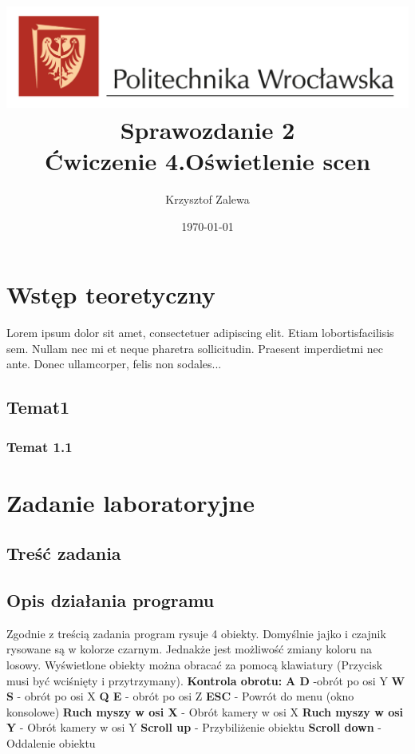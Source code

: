 \documentclass{article}
\title{
  \centering
  \includegraphics[width=\textwidth]{images/logo_PWr_kolor_poziom.png}\\
  \fontsize{28pt}{30pt}\selectfont Sprawozdanie 2\\
  \fontsize{14pt}{30pt}\selectfont Ćwiczenie 4.Oświetlenie scen}
\author{Krzysztof Zalewa}
\date{\daymonthyear\today}
\begin{document}
  \maketitle
  \pagebreak
  \tableofcontents
  
  \section{Wstęp teoretyczny}
  Lorem  ipsum  dolor  sit  amet,  consectetuer  adipiscing  
  elit.   Etiam  lobortisfacilisis sem.  Nullam nec mi et 
  neque pharetra sollicitudin.  Praesent imperdietmi nec ante. 
  Donec ullamcorper, felis non sodales...
  \subsection{Temat1}
  \subsubsection{Temat 1.1}

  \section{Zadanie laboratoryjne}
  \subsection{Treść zadania}
  \subsection{Opis działania programu}
  Zgodnie z treścią zadania program rysuje 4 obiekty. Domyślnie 
  jajko i czajnik rysowane są w kolorze czarnym. Jednakże jest 
  możliwość zmiany koloru na losowy. Wyświetlone obiekty można 
  obracać za pomocą klawiatury (Przycisk musi być wciśnięty i 
  przytrzymany).\linebreak 
  \textbf{Kontrola obrotu:}\linebreak  
  \textbf{A D} -obrót po osi Y\linebreak 
  \textbf{W S} - obrót po osi X\linebreak 
  \textbf{Q E} - obrót po osi Z\linebreak 
  \textbf{ESC} - Powrót do menu (okno konsolowe)\linebreak 
  \textbf{Ruch myszy w osi X} - Obrót kamery w osi X\linebreak 
  \textbf{Ruch myszy w osi Y} - Obrót kamery w osi Y\linebreak 
  \textbf{Scroll up} - Przybiliżenie obiektu\linebreak 
  \textbf{Scroll down} - Oddalenie obiektu\linebreak 
\end{document}

